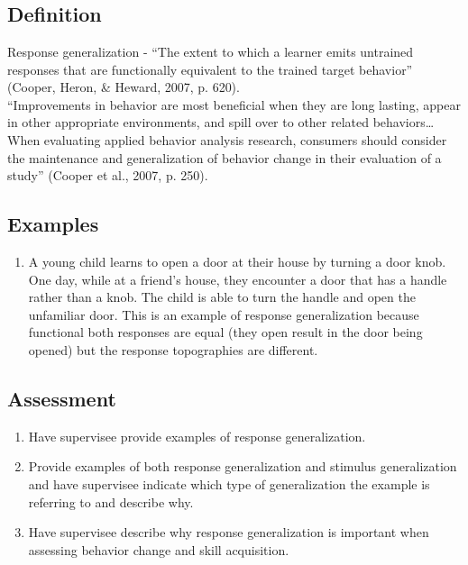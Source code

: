 \section{\fourFKThirtySix{}}
\subsection{Definition} 
Response generalization - ``The extent to which a learner emits untrained responses that are functionally equivalent to the trained target behavior'' (Cooper, Heron, \& Heward, 2007, p. 620).\\
%
``Improvements in behavior are most beneficial when they are long lasting, appear in other appropriate environments, and spill over to other related behaviors…When evaluating applied behavior analysis research, consumers should consider the maintenance and generalization of behavior change in their evaluation of a study'' (Cooper et al., 2007, p. 250).\\
%
\subsection{Examples}
\begin{enumerate}
\item A young child learns to open a door at their house by turning a door knob. One day, while at a friend's house, they encounter a door that has a handle rather than a knob. The child is able to turn the handle and open the unfamiliar door. This is an example of response generalization because functional both responses are equal (they open result in the door being opened) but the response topographies are different.
%
\end{enumerate}
%
\subsection{Assessment}
\begin{enumerate}
\item Have supervisee provide examples of response generalization.
\item Provide examples of both response generalization and stimulus generalization and have supervisee indicate which type of generalization the example is referring to and describe why.
\item Have supervisee describe why response generalization is important when assessing behavior change and skill acquisition.
%
\end{enumerate}
%
